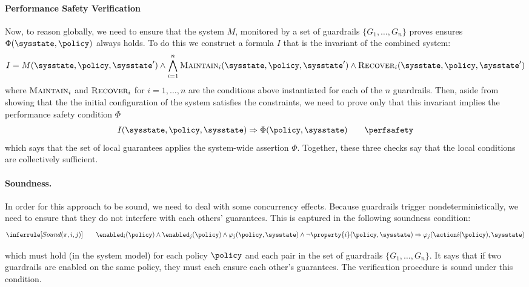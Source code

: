 \paragraph{Performance Safety Verification}
Now, to reason globally, we need to ensure that the system $M$, monitored by a set of guardrails $\{G_1, \ldots, G_n\}$  proves ensures $\Phi(\sysstate, \policy)$ always holds. To do this we construct a formula $I$ that is the invariant of the combined system:
\[
I =
M(\sysstate, \policy, \sysstate') \wedge
\bigwedge_{i=1}^n \textsc{Maintain}_i(\sysstate, \policy, \sysstate') \wedge 
\textsc{Recover}_i(\sysstate,\policy, \sysstate')
\]
where $\textsc{Maintain}_i$ and $\textsc{Recover}_i$ for $i = 1,\ldots, n$ are the conditions above instantiated for each of the $n$ guardrails. Then, aside from showing that the the initial configuration of the system satisfies the constraints, we need to prove only that this invariant implies the performance safety condition $\Phi$
\[
\begin{array}{c@{\qquad}l}
    I(\sysstate, \policy, \sysstate) \Rightarrow \Phi(\policy, \sysstate)
    & \text{\perfsafety}
\end{array}  
\]
which says that the set of local guarantees applies  the system-wide assertion $\Phi$. Together, these three checks say that the local conditions are collectively sufficient.

\paragraph{Soundness.} In order for this approach to be sound, we need to deal with some concurrency effects. Because guardrails trigger nondeterministically, we need to ensure that they do not interfere with each others' guarantees. This is captured in the following soundness condition:
\[
\inferrule[Sound(\ensuremath{\pi},\ensuremath{i},\ensuremath{j})]{}
{\qquad\enabled_i(\policy) \wedge 
\enabled_j(\policy) \wedge
\varphi_j(\policy, \sysstate) \wedge
\neg \property{i}(\policy, \sysstate) \Rightarrow
\varphi_j(\action i(\policy), \sysstate) }
\]

which must hold (in the system model) for each policy $\policy$ and each pair  in the set of guardrails $\{G_1, \ldots, G_n\}$. It says that if two guardrails are enabled on the same policy, they must each ensure each other's guarantees. The verification procedure is sound under this condition.

